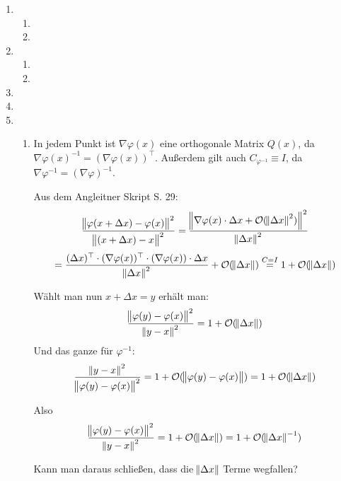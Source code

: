 \documentclass[a4paper,11pt]{scrartcl}
\newcommand*{\Ld}{\mathcal{O}}
\newcommand*{\Dx}{\Delta{}x}
\begin{document}
\begin{enumerate}[label*=\textbf{9.\arabic*.}]

\item
  \begin{enumerate}
  \item
  \item
\end{enumerate}


\item \begin{enumerate}
  \item
  \item
\end{enumerate}


\item


\item


\item \begin{enumerate}
  \item
    In jedem Punkt ist $\nabla \varphi(x)$ eine orthogonale Matrix $Q(x)$,
    da $\nabla\varphi(x)^{-1} = (\nabla \varphi(x))^\top$.
    Außerdem gilt auch $C_{\varphi^{-1}} \equiv I$, da $\nabla \varphi^{-1} =
    (\nabla \varphi)^{-1}$.

    Aus dem Angleitner Skript S. 29:
    \[
      \frac{\norm{\varphi(x+\Dx) - \varphi(x)}^2}{\norm{(x + \Dx) - x}^2}
    = \frac{\norm{\nabla\varphi(x)\cdot \Dx + \Ld(\norm{\Delta
          x}^2)}^2}{\norm{\Dx}^2}\]
    \[= \frac{(\Dx)^\top \cdot
      (\nabla\varphi(x))^\top \cdot (\nabla\varphi(x))\cdot \Dx}{\norm{\Delta
        x}^2} + \Ld(\norm{\Dx}) \overset{C=I}{=} 1 + \Ld(\norm{\Dx}) \]

  Wählt man nun $x + \Dx = y$ erhält man:
\[ \frac{\norm{\varphi(y) - \varphi(x)}^2}{\norm{y - x}^2} = 1 +
  \Ld(\norm{\Dx}) \]
Und das ganze für $\varphi^{-1}$:
\[ \frac{\norm{y - x}^2}{\norm{\varphi(y) - \varphi(x)}^2} = 1 +
  \Ld(\norm{\varphi(y)-\varphi(x)}) = 1 + \Ld(\norm{\Dx})\]

Also
\[ \frac{\norm{\varphi(y) - \varphi(x)}^2}{\norm{y - x}^2} = 1 +
  \Ld(\norm{\Dx}) = 1 + \Ld(\norm{\Dx}^{-1}) \]

Kann man daraus schließen, dass die $\norm{\Dx}$ Terme wegfallen?


\end{enumerate}
\end{enumerate}
\end{document}
